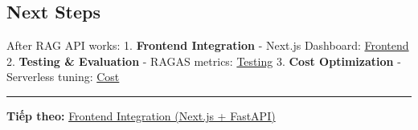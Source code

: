 \hypertarget{next-steps}{%
\subsection{Next Steps}}

After RAG API works: 1. \textbf{Frontend Integration} - Next.js
Dashboard: \href{5.14-Frontend/}{Frontend} 2. \textbf{Testing \&
Evaluation} - RAGAS metrics: \href{5.15-Testing/}{Testing} 3.
\textbf{Cost Optimization} - Serverless tuning: \href{5.16-Cost/}{Cost}

\begin{center}\rule{0.5\linewidth}{0.5pt}\end{center}

\textbf{Tiếp theo:} \href{5.14-Frontend/}{Frontend Integration (Next.js
+ FastAPI)}
